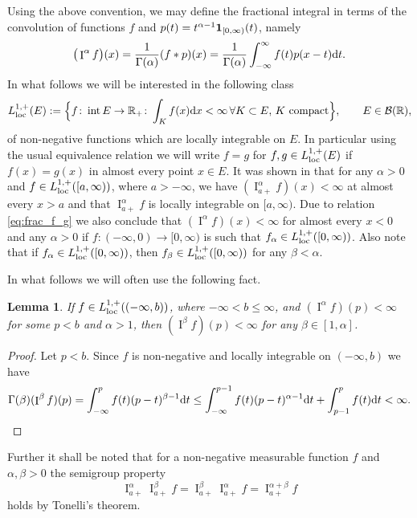 \documentclass[11pt,a4paper]{article}
\theoremstyle{plain}
\newtheorem{lemma}[theorem]{Lemma}
\theoremstyle{definition}
\theoremstyle{remark}
\def\RR{\mathbb{R}}
\def\cB{\mathcal{B}}
\newcommand{\dd}{{\rm d}}
\newcommand{\frI}{\mathop{\mathrm{I}}\nolimits}
\newcommand{\inter}{\operatorname{int}}
\newcommand{\dint}{\textup{d}}
\begin{document}
    Using the above convention, we may define the fractional integral in terms of the  convolution of functions $f$ and $p(t)=t^{\alpha-1}{\bf 1}_{[0,\infty)}(t)$, namely
\begin{align*}
    \big(\frI^{\alpha}f\big)(x)={1\over \Gamma(\alpha)}(f*p)(x)={1\over \Gamma(\alpha)}\int_{-\infty}^{\infty}f(t)p(x-t)\dint t.
\end{align*}
In what follows we will be interested in the following class 
\[
    L_{{\rm loc}}^{1,+}(E):=\Big\{f\colon \inter E\to \RR_+ \colon \int_Kf(x)\dd x<\infty \, \forall K\subset E, \, K\text{ compact}\Big\},\qquad E\in\cB(\RR),
\] 
of non-negative functions which are locally integrable on $E$. In particular using the usual equivalence relation we will write $f=g$ for $f,g\in L_{{\rm loc}}^{1,+}(E)$ if $f(x)=g(x)$ in almost every point $x\in E$. It was shown in \cite[Lemma 2.1.]{MARTINEZ1992111} that for any $\alpha>0$ and $f\in L_{{\rm loc}}^{1,+}([a,\infty))$, where $a>-\infty$, we have $(\frI_{a+}^{\alpha}f)(x)<\infty$ at almost every $x>a$ and that $\frI_{a+}^{\alpha}f$ is locally integrable on $[a,\infty)$. Due to relation \eqref{eq:frac_f_g} we also conclude that $(\frI^{\alpha}f)(x)<\infty$ for almost every $x<0$ and any $\alpha>0$ if $f\colon(-\infty,0)\to[0,\infty)$ is such that $f_{\alpha}\in L_{{\rm loc}}^{1,+}([0,\infty))$. Also note that if $f_{\alpha}\in L_{{\rm loc}}^{1,+}([0,\infty))$, then $f_{\beta}\in L_{{\rm loc}}^{1,+}([0,\infty))$ for any $\beta<\alpha$.

In what follows we will often use the following fact. 

\begin{lemma}\label{lm:technical}
    If $f\in L_{\rm loc}^{1,+}((-\infty,b))$, where $-\infty<b\le \infty$, and $(\frI^{\alpha}f)(p)<\infty$ for some $p<b$ and $\alpha>1$, then $(\frI^{\beta}f)(p)<\infty$ for any $\beta\in [1,\alpha]$. 
\end{lemma}

\begin{proof}
    Let $p<b$. Since $f$ is non-negative and locally integrable on $(-\infty,b)$ we have
    \[
        \Gamma(\beta)(\frI^{\beta}f)(p)=\int_{-\infty}^{p}f(t)(p-t)^{\beta-1}\dd t\leq \int_{-\infty}^{p-1}f(t)(p-t)^{\alpha-1}\dd t+\int_{p-1}^pf(t)\dd t<\infty.
    \]
\end{proof}


Further it shall be noted that for a non-negative measurable function $f$ and $\alpha, \beta > 0$ the semigroup property
\begin{equation}\label{eq:SemigroupProp}
    \frI_{a+}^\alpha \frI_{a+}^\beta f=\frI_{a+}^\beta \frI_{a+}^\alpha f = \frI_{a+}^{\alpha+\beta} f
\end{equation}
holds by Tonelli's theorem.
\end{document}
